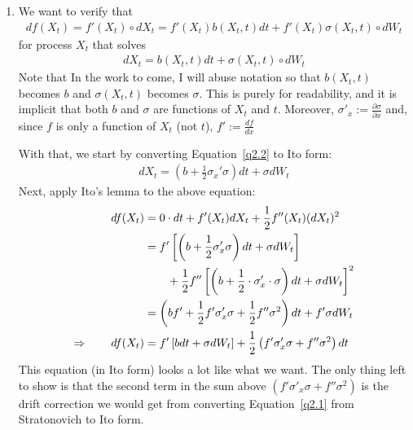 \documentclass[12pt]{article}
\theoremstyle{plain}
\theoremstyle{definition}
\theoremstyle{remark}
\begin{document}
\begin{enumerate}
  \item %
    We want to verify that
    \begin{align}
      df(X_t) = f'(X_t) \circ dX_t =
      f'(X_t) b(X_t,t) dt + f'(X_t) \sigma(X_t,t) \circ dW_t
      \label{q2.1}
    \end{align}
    for process $X_t$ that solves
    \begin{align}
      \label{q2.2}
      dX_t = b(X_t,t) dt + \sigma(X_t,t)\circ dW_t
    \end{align}
    Note that In the work to come, I will abuse notation so that
    $b(X_t,t)$ becomes $b$ and $\sigma(X_t,t)$ becomes $\sigma$. This is
    purely for readability, and it is implicit that both $b$ and
    $\sigma$ are functions of $X_t$ and $t$. Moreover,
    $\sigma'_x:=\frac{\partial\sigma}{\partial x}$ and, since $f$ is
    only a function of $X_t$ (not $t$), $f':=\frac{df}{dx}$

    With that, we start by converting Equation~\ref{q2.2} to Ito form:
    \begin{align*}
      dX_t = \left( b + \frac{1}{2} \sigma_x' \sigma
        \right) dt
        + \sigma dW_t
    \end{align*}
    Next, apply Ito's lemma to the above equation:
    \begin{align}
      df(X_t) &=
      0 \cdot dt
      + f'(X_t) dX_t
      + \frac{1}{2} f''(X_t) (dX_t)^2\notag\\
      &=
      f'
        \left[
          \left(
          b + \frac{1}{2} \sigma_x' \sigma
          \right)
        dt
        + \sigma dW_t
      \right]\notag\\
      &\qquad
      + \frac{1}{2} f''
      \left[\left( b + \frac{1}{2}\cdot
        \sigma_x' \cdot \sigma
        \right) dt
      + \sigma dW_t\right]^2\notag\\
      &= \left(
      b f'
      + \frac{1}{2} f' \sigma'_x \sigma
        + \frac{1}{2} f'' \sigma^2
        \right) dt
        + f' \sigma dW_t\notag\\
      \Rightarrow \qquad
      df(X_t)
      &= f' \left[ b dt + \sigma dW_t\right]
        + \frac{1}{2}
          \left( f' \sigma'_x \sigma +  f'' \sigma^2\right) dt
          \label{q2.3}
    \end{align}
    This equation (in Ito form) looks a lot like what we want. The only
    thing left to show is that the second term in the sum above $\left(
    f' \sigma'_x \sigma +  f'' \sigma^2\right)$ is the drift correction
    we would get from converting Equation~\ref{q2.1} from Stratonovich
    to Ito form.


\end{enumerate}
\end{document}
